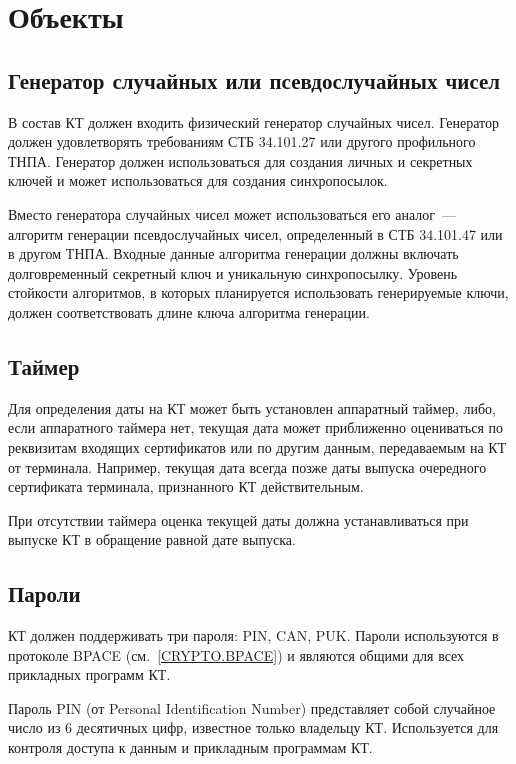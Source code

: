 \chapter{Объекты}\label{OBJ}

\section{Генератор случайных или псевдослучайных чисел}\label{OBJ.RNG}

В состав КТ должен входить физический генератор случайных чисел.
Генератор должен удовлетворять требованиям СТБ 34.101.27 или другого 
профильного ТНПА. Генератор должен использоваться для создания личных и 
секретных ключей и может использоваться для создания синхропосылок. 

Вместо генератора случайных чисел может использоваться его аналог~--- алгоритм 
генерации псевдослучайных чисел, определенный в СТБ 34.101.47 или в другом 
ТНПА. Входные данные алгоритма генерации должны включать долговременный 
секретный ключ и уникальную синхропосылку.
%
Уровень стойкости алгоритмов, в которых планируется использовать 
генерируемые ключи, должен соответствовать длине ключа алгоритма генерации.

\section{Таймер}\label{OBJ.Date}

Для определения даты на КТ может быть установлен аппаратный таймер, либо, 
если аппаратного таймера нет, текущая дата может приближенно оцениваться по 
реквизитам входящих сертификатов или по другим данным, передаваемым на КТ 
от терминала. Например, текущая дата всегда позже даты выпуска очередного 
сертификата терминала, признанного КТ действительным.

При отсутствии таймера оценка текущей даты должна устанавливаться при выпуске 
КТ в обращение равной дате выпуска. 

\section{Пароли}\label{OBJ.PWD}

КТ должен поддерживать три пароля: PIN, CAN, PUK.
Пароли используются в протоколе BPACE (см.~\ref{CRYPTO.BPACE})
и являются общими для всех прикладных программ КТ.

Пароль PIN (от Personal Identification Number)
представляет собой случайное число из 6 десятичных цифр,
известное только владельцу КТ. Используется для контроля доступа к данным и 
прикладным программам КТ.  

